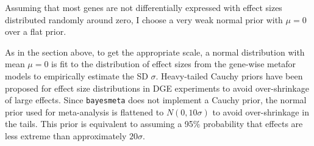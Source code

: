 Assuming that most genes are not differentially expressed with effect sizes distributed randomly around zero, I choose a very weak normal prior with $\mu=0$ over a flat prior.

As in the section above, to get the appropriate scale, a normal distribution with mean $\mu = 0$ is fit to the distribution of effect sizes from the gene-wise metafor models to empirically estimate the \gls{SD} $\sigma$.
Heavy-tailed Cauchy priors have been proposed for effect size distributions in \gls{DGE} experiments to avoid over-shrinkage of large effects\autocite{zhu2019HeavytailedPriorDistributions}.
Since \texttt{bayesmeta} does not implement a Cauchy prior, the normal prior used for meta-analysis is flattened to $N(0, 10\sigma)$ to avoid over-shrinkage in the tails.
This prior is equivalent to assuming a 95\% probability that effects are less extreme than approximately $20\sigma$.

